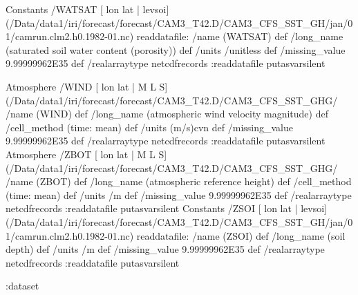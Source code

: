 \begin{ingrid}
Constants /WATSAT{
[ lon lat | levsoi] (/Data/data1/iri/forecast/forecast/CAM3_T42.D/CAM3_CFS_SST_GH/jan/01/camrun.clm2.h0.1982-01.nc) readdatafile:
/name (WATSAT) def
 /long_name (saturated soil water content (porosity)) def
 /units /unitless def
 /missing_value 9.99999962E35 def
 /realarraytype netcdfrecords :readdatafile
}putasvarsilent

Atmosphere /WIND{
[ lon lat | M L S] (/Data/data1/iri/forecast/forecast/CAM3_T42.D/CAM3_CFS_SST_GHG/%
/name (WIND) def
 /long_name (atmospheric wind velocity magnitude) def
 /cell_method (time: mean) def
 /units (m/s)cvn def
 /missing_value 9.99999962E35 def
 /realarraytype netcdfrecords :readdatafile
}putasvarsilent
Atmosphere /ZBOT{
[ lon lat | M L S] (/Data/data1/iri/forecast/forecast/CAM3_T42.D/CAM3_CFS_SST_GHG/%
/name (ZBOT) def
 /long_name (atmospheric reference height) def
 /cell_method (time: mean) def
 /units /m def
 /missing_value 9.99999962E35 def
 /realarraytype netcdfrecords :readdatafile
}putasvarsilent
Constants /ZSOI{
[ lon lat | levsoi] (/Data/data1/iri/forecast/forecast/CAM3_T42.D/CAM3_CFS_SST_GH/jan/01/camrun.clm2.h0.1982-01.nc) readdatafile:
/name (ZSOI) def
 /long_name (soil depth) def
 /units /m def
 /missing_value 9.99999962E35 def
 /realarraytype netcdfrecords :readdatafile
}putasvarsilent

:dataset
\end{ingrid}
